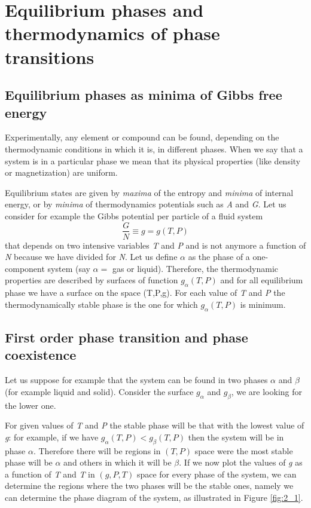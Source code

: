 \documentclass[../../Main/Main.tex]{subfiles}
\begin{document}
\chapter{Equilibrium phases and thermodynamics of phase transitions}


\section{Equilibrium phases as minima of Gibbs free energy}

Experimentally, any element or compound can be found, depending on the thermodynamic conditions in which it is, in different phases. When we say that a system is in a particular phase we mean that its physical properties (like density or magnetization) are uniform.

Equilibrium states are given by \emph{maxima} of the entropy and \emph{minima} of internal energy, or by \emph{minima} of thermodynamics potentials such as \emph{A} and \emph{G}.
Let us consider for example the Gibbs potential per particle of a fluid system
\begin{equation}
  \frac{G}{N} \equiv g = g (T,P)
  \label{eq:}
\end{equation}
  that depends on two intensive variables \emph{T} and \emph{P} and is not anymore a function of \emph{N} because we have divided for \emph{N}.
  Let us define \( \alpha  \) as the phase of a one-component system (say \( \alpha = \) gas or liquid). Therefore, the thermodynamic properties are described by surfaces of function \( g_\alpha (T,P) \) and for all equilibrium phase we have a surface on the space (T,P,g). For each value of \emph{T} and \emph{P} the thermodynamically stable phase is the one for which \( g_ \alpha (T,P) \) is minimum.

\section{First order phase transition and phase coexistence}

Let us suppose for example that the system can be found in two phases \( \alpha  \)  and \( \beta  \)  (for example liquid and solid).
Consider the surface \( g_ \alpha  \) and \( g_ \beta  \), we are looking for the lower one.

For given values of \emph{T}  and \emph{P}  the stable phase will be that with the lowest value of \emph{g}: for example, if we have \( g_{\alpha } (T,P) < g_{\beta} (T,P) \) then the system will be in phase \( \alpha  \). Therefore there will be regions in \( (T,P) \)  space were the most stable phase will be \( \alpha  \)  and others in which it will be \( \beta  \).
If we now plot the values of \emph{g}  as a function of \emph{T}  and \emph{T}  in \( (g,P,T) \)  space for every phase of the system, we can determine the regions where the two phases will be the stable ones, namely we can determine the phase diagram of the system, as illustrated in  Figure \ref{fig:2_1}.
\end{document}
